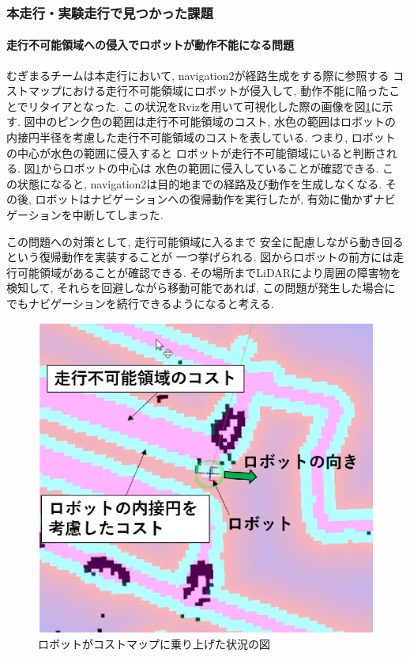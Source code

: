 \subsubsection{本走行・実験走行で見つかった課題}
\paragraph{走行不可能領域への侵入でロボットが動作不能になる問題}
むぎまるチームは本走行において, navigation2が経路生成をする際に参照する
コストマップにおける走行不可能領域にロボットが侵入して, 
動作不能に陥ったことでリタイアとなった. 
この状況をRvizを用いて可視化した際の画像を図\ref{fig:mugimaru_result}に示す. 
図中のピンク色の範囲は走行不可能領域のコスト, 
水色の範囲はロボットの内接円半径を考慮した走行不可能領域のコストを表している. 
つまり, ロボットの中心が水色の範囲に侵入すると
ロボットが走行不可能領域にいると判断される. 
図\ref{fig:mugimaru_result}からロボットの中心は
水色の範囲に侵入していることが確認できる. 
この状態になると, navigation2は目的地までの経路及び動作を生成しなくなる. 
その後, ロボットはナビゲーションへの復帰動作を実行したが, 
有効に働かずナビゲーションを中断してしまった. 

この問題への対策として, 走行可能領域に入るまで
安全に配慮しながら動き回るという復帰動作を実装することが
一つ挙げられる. 
図からロボットの前方には走行可能領域があることが確認できる. 
その場所までLiDARにより周囲の障害物を検知して, 
それらを回避しながら移動可能であれば, 
この問題が発生した場合にでもナビゲーションを続行できるようになると考える. 
\begin{figure}[h]
  \begin{center}
  	\includegraphics[width=0.9\linewidth]{figs/mugimaru_result.eps}
  	\caption{ロボットがコストマップに乗り上げた状況の図} 
  	\label{fig:mugimaru_result}
  \end{center}
\end{figure}

